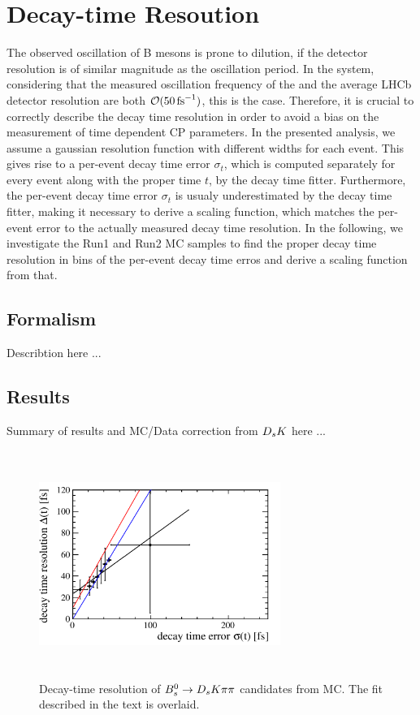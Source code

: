 \section{Decay-time Resoution}
\label{sec:Resolution}

The observed oscillation of B mesons is prone to dilution, if the detector resolution is of similar magnitude as the oscillation period. 
In the \Bs system, considering that the measured oscillation frequency of the \Bs \cite{PDG2014} and the average LHCb detector resolution \cite{LHCb-DP-2014-002} are both $\mathcal{O}(50 \mathrm{ \,fs}^{-1})$, this is the case.
Therefore, it is crucial to correctly describe the decay time resolution in order to avoid a bias on the measurement of time dependent CP parameters. \newline
In the presented analysis, we assume a gaussian resolution function with different widths for each event. 
This gives rise to a per-event decay time error $\sigma_{t}$, which is computed separately for every event along with the proper time $t$, by the decay time fitter. 
Furthermore, the per-event decay time error $\sigma_{t}$ is usualy underestimated by the decay time fitter, 
making it necessary to derive a scaling function, which matches the per-event error to the actually measured decay time resolution. 
In the following, we investigate the Run1 and Run2 MC samples to find the proper decay time resolution in bins of the per-event decay time erros and derive a scaling function from that.      


\subsection{Formalism}

Describtion here ...




\subsection{Results}

Summary of results and MC/Data correction from ${{D}_{s}}{K}$ here ...


\begin{figure}[h]
\includegraphics[height=7.4cm,width=0.7\textwidth]{figs/ProperTimeReso_MC.pdf}
\caption{Decay-time resolution of ${{B}^0_{s}}\rightarrow{\ensuremath{{D}_{s}}}{\ensuremath{K}}{\ensuremath{\pi}}{\ensuremath{\pi}}$ candidates from MC. The fit described in the text is overlaid.}
\label{fig:ResoFit_compared}
\end{figure}


